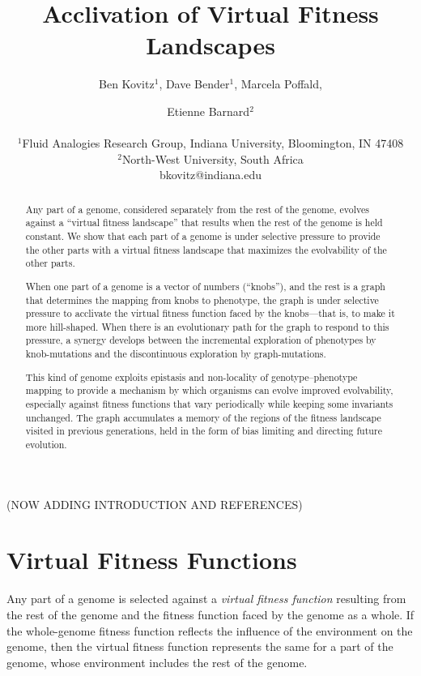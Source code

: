 \documentclass[letterpaper]{article}
\title{Acclivation of Virtual Fitness Landscapes}
\author{Ben Kovitz$^{1}$, Dave Bender$^{1}$, Marcela Poffald, \and Etienne
Barnard$^{2}$ \\
\mbox{}\\
$^1$Fluid Analogies Research Group, Indiana University, Bloomington, IN 47408 \\
$^2$North-West University, South Africa \\
bkovitz@indiana.edu}
\begin{document}
\maketitle

\begin{abstract}
Any part of a genome, considered separately from the rest of the genome,
evolves against a ``virtual fitness landscape'' that results when the rest of
the genome is held constant. We show that each part of a genome is under
selective pressure to provide the other parts with a virtual fitness landscape
that maximizes the evolvability of the other parts.

When one part of a genome is a vector of numbers (``knobs''), and the rest is a
graph that determines the mapping from knobs to phenotype, the graph is under
selective pressure to acclivate the virtual fitness function faced by the
knobs---that is, to make it more hill-shaped. When there is an evolutionary
path for the graph to respond to this pressure, a synergy develops between the
incremental exploration of phenotypes by knob-mutations and the discontinuous
exploration by graph-mutations.

This kind of genome exploits epistasis and non-locality of genotype--phenotype
mapping to provide a mechanism by which organisms can evolve improved
evolvability, especially against fitness functions that vary periodically while
keeping some invariants unchanged. The graph accumulates a memory of the
regions of the fitness landscape visited in previous generations, held in the
form of bias limiting and directing future evolution.
\end{abstract}

%

(NOW ADDING INTRODUCTION AND REFERENCES)

\section{Virtual Fitness Functions}

Any part of a genome is selected against a \textit{virtual fitness function}
resulting from the rest of the genome and the fitness function faced by the
genome as a whole. If the whole-genome fitness function reflects the influence
of the environment on the genome, then the virtual fitness function represents
the same for a part of the genome, whose environment includes the rest of
the genome.
\end{document}
